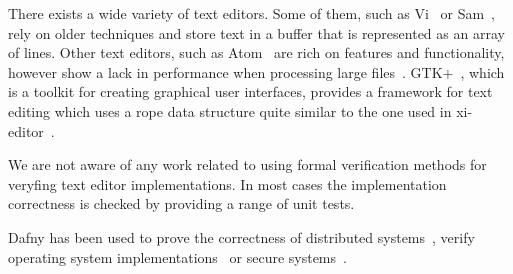 There exists a wide variety of text editors.
Some of them, such as Vi~\cite{vi} or Sam~\cite{pike1987text}, rely on older techniques and store text in a buffer that is represented as an array of lines.
Other text editors, such as Atom~\cite{atom} are rich on features and functionality, however show a lack in performance when processing large files~\cite{atom-perf}.
GTK+~\cite{gtk}, which is a toolkit for creating graphical user interfaces, provides a framework for text editing which uses a rope data structure quite similar to the one used in xi-editor~\cite{gtk-rope}.

We are not aware of any work related to using formal verification methods for veryfing text editor implementations.
In most cases the implementation correctness is checked by providing a range of unit tests.

Dafny has been used to prove the correctness of distributed systems~\cite{hawblitzel2015ironfleet}, verify operating system implementations~\cite{mai2013verifying} or secure systems~\cite{hawblitzel2014ironclad}.
